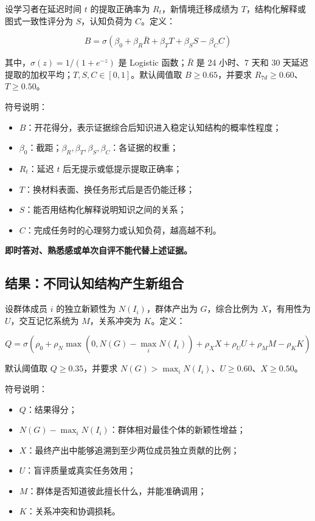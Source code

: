 \documentclass[UTF8,a4paper,11pt]{ctexart}
\newcommand{\warn}[1]{\textcolor{red!70!black}{\textbf{#1}}}
\begin{document}
设学习者在延迟时间 $t$ 的提取正确率为 $R_t$，新情境迁移成绩为 $T$，结构化解释或图式一致性评分为 $S$，认知负荷为 $C$。定义：

\begin{equation}
B=\sigma\left(\beta_0+\beta_R \bar R+\beta_T T+\beta_S S-\beta_C C\right)
\end{equation}

其中，$\sigma(z)=1/(1+e^{-z})$ 是 Logistic 函数；$\bar R$ 是 24 小时、7 天和 30 天延迟提取的加权平均；$T,S,C\in[0,1]$。默认阈值取 $B\ge0.65$，并要求 $R_{7d}\ge0.60$、$T\ge0.50$。

符号说明：
\begin{itemize}[leftmargin=2em]
\item $B$：开花得分，表示证据综合后知识进入稳定认知结构的概率性程度；
\item $\beta_0$：截距；$\beta_R,\beta_T,\beta_S,\beta_C$：各证据的权重；
\item $R_t$：延迟 $t$ 后无提示或低提示提取正确率；
\item $T$：换材料表面、换任务形式后是否仍能迁移；
\item $S$：能否用结构化解释说明知识之间的关系；
\item $C$：完成任务时的心理努力或认知负荷，越高越不利。
\end{itemize}

\warn{即时答对、熟悉感或单次自评不能代替上述证据。}

\subsection{结果：不同认知结构产生新组合}

设群体成员 $i$ 的独立新颖性为 $N(I_i)$，群体产出为 $G$，综合比例为 $X$，有用性为 $U$，交互记忆系统为 $M$，关系冲突为 $K$。定义：

\begin{equation}
Q=\sigma\left(\rho_0+\rho_N\max(0,N(G)-\max_i N(I_i))+\rho_X X+\rho_U U+\rho_M M-\rho_K K\right)
\end{equation}

默认阈值取 $Q\ge0.35$，并要求 $N(G)>\max_i N(I_i)$、$U\ge0.60$、$X\ge0.50$。

符号说明：
\begin{itemize}[leftmargin=2em]
\item $Q$：结果得分；
\item $N(G)-\max_i N(I_i)$：群体相对最佳个体的新颖性增益；
\item $X$：最终产出中能够追溯到至少两位成员独立贡献的比例；
\item $U$：盲评质量或真实任务效用；
\item $M$：群体是否知道彼此擅长什么，并能准确调用；
\item $K$：关系冲突和协调损耗。
\end{itemize}
\end{document}
